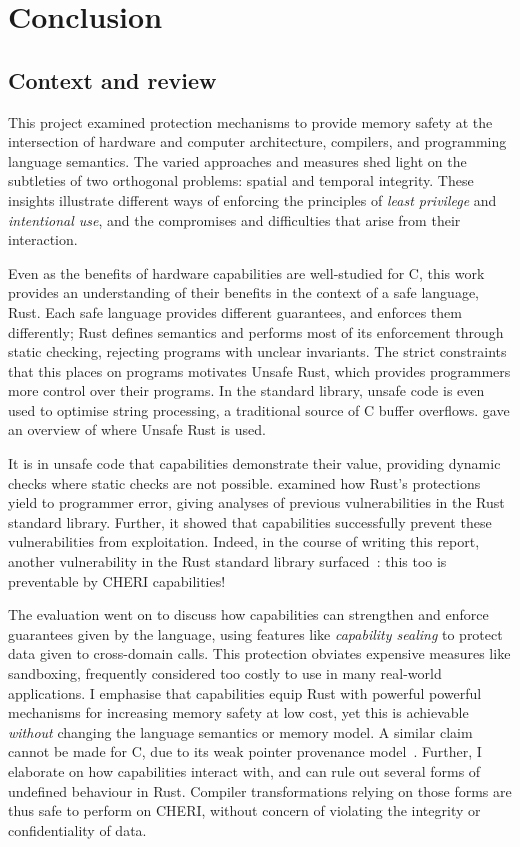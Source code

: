 \documentclass[dissertation.tex]{subfiles}
\begin{document}
\chapter{Conclusion}

\section{Context and review}

This project examined protection mechanisms to provide memory safety at
the intersection of hardware and computer architecture, compilers, and
programming language semantics.
The varied approaches and measures shed light on the subtleties of
two orthogonal problems: spatial and temporal integrity.
These insights illustrate different ways of enforcing the principles of
\emph{least privilege} and \emph{intentional use}, and the compromises
and difficulties that arise from their interaction.

Even as the benefits of hardware capabilities are well-studied for C,
this work provides an understanding of their benefits in the context of
a safe language, Rust.
Each safe language provides different guarantees, and enforces them
differently; Rust defines semantics and performs most of its enforcement
through static checking, rejecting programs with unclear invariants.
The strict constraints that this places on programs motivates Unsafe
Rust, which provides programmers more control over their programs.
In the standard library, unsafe code is even used to optimise string
processing, a traditional source of C buffer overflows.
 gave an overview of where
Unsafe Rust is used.

It is in unsafe code that capabilities demonstrate their value,
providing dynamic checks where static checks are not possible.
 examined how Rust's protections yield to
programmer error, giving analyses of previous vulnerabilities in the
Rust standard library.
Further, it showed that capabilities successfully prevent these
vulnerabilities from exploitation.
Indeed, in the course of writing this report, another vulnerability in
the Rust standard library surfaced~\cite{rust-advisory-cast}: this too
is preventable by CHERI capabilities!

The evaluation went on to discuss how capabilities can strengthen and
enforce guarantees given by the language, using features like
\emph{capability sealing} to protect data given to cross-domain calls.
This protection obviates expensive measures like sandboxing, frequently
considered too costly to use in many real-world applications.
I emphasise that capabilities equip Rust with powerful powerful
mechanisms for increasing memory safety at low cost, yet this is
achievable \emph{without} changing the language semantics or memory
model.
A similar claim cannot be made for C, due to its weak pointer
provenance model~\cite{cheri-2019-abstract}.
Further, I elaborate on how capabilities interact with, and can rule out
several forms of undefined behaviour in Rust.
Compiler transformations relying on those forms are thus safe to
perform on CHERI, without concern of violating the integrity or
confidentiality of data.
\end{document}
